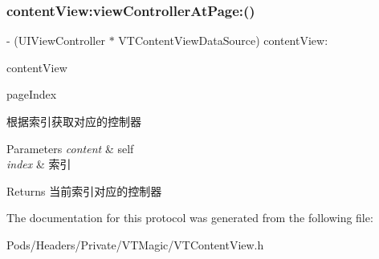 \subsubsection{\texorpdfstring{content\+View\+:view\+Controller\+At\+Page\+:()}{contentView:viewControllerAtPage:()}\hspace{0.1cm}{\footnotesize\ttfamily [3/3]}}
{\footnotesize\ttfamily -\/ (U\+I\+View\+Controller $\ast$ V\+T\+Content\+View\+Data\+Source) content\+View\+: \begin{DoxyParamCaption}\item[{(\mbox{\hyperlink{interface_v_t_content_view}{V\+T\+Content\+View}} $\ast$)}]{content\+View }\item[{viewControllerAtPage:(N\+S\+U\+Integer)}]{page\+Index }\end{DoxyParamCaption}}

根据索引获取对应的控制器


\begin{DoxyParams}{Parameters}
{\em content} & self \\
\hline
{\em index} & 索引\\
\hline
\end{DoxyParams}
\begin{DoxyReturn}{Returns}
当前索引对应的控制器 
\end{DoxyReturn}


The documentation for this protocol was generated from the following file\+:\begin{DoxyCompactItemize}
\item 
Pods/\+Headers/\+Private/\+V\+T\+Magic/V\+T\+Content\+View.\+h\end{DoxyCompactItemize}
